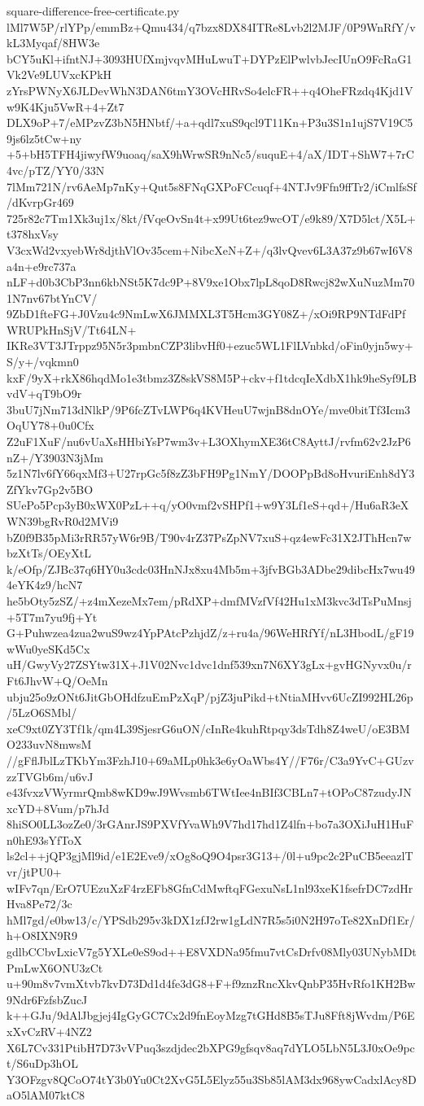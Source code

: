 \documentclass[11pt]{article}
\theoremstyle{definition}
\theoremstyle{remark}
\begin{document}
\begin{filecontents*}[overwrite]{square-difference-free-certificate.py}
lMl7W5P/rlYPp/emmBz+Qmu434/q7bzx8DX84ITRe8Lvb2l2MJF/0P9WnRfY/vkL3Myqaf/8HW3e
bCY5uKl+ifntNJ+3093HUfXmjvqvMHuLwuT+DYPzElPwlvbJecIUnO9FcRaG1Vk2Ve9LUVxcKPkH
zYrsPWNyX6JLDevWhN3DAN6tmY3OVcHRvSo4elcFR++q4OheFRzdq4Kjd1Vw9K4Kju5VwR+4+Zt7
DLX9oP+7/eMPzvZ3bN5HNbtf/+a+qdl7xuS9qcl9T11Kn+P3u3S1n1ujS7V19C59js6lz5tCw+ny
+5+bH5TFH4jiwyfW9uoaq/saX9hWrwSR9nNc5/suquE+4/aX/IDT+ShW7+7rC4vc/pTZ/YY0/33N
7lMm721N/rv6AeMp7nKy+Qut5s8FNqGXPoFCcuqf+4NTJv9Ffn9ffTr2/iCmlfsSf/dKvrpGr469
725r82c7Tm1Xk3uj1x/8kt/fVqeOvSn4t+x99Ut6tez9wcOT/e9k89/X7D5lct/X5L+t378hxVsy
V3cxWd2vxyebWr8djthVlOv35cem+NibcXeN+Z+/q3lvQvev6L3A37z9b67wI6V8a4n+e9rc737a
nLF+d0b3CbP3nn6kbNSt5K7dc9P+8V9xe1Obx7lpL8qoD8Rwcj82wXuNuzMm701N7nv67btYnCV/
9ZbD1fteFG+J0Vzu4c9NmLwX6JMMXL3T5Hcm3GY08Z+/xOi9RP9NTdFdPfWRUPkHnSjV/Tt64LN+
IKRe3VT3JTrppz95N5r3pmbnCZP3libvHf0+ezuc5WL1FlLVnbkd/oFin0yjn5wy+S/y+/vqkmn0
kxF/9yX+rkX86hqdMo1e3tbmz3Z8skVS8M5P+ckv+f1tdcqIeXdbX1hk9heSyf9LBvdV+qT9bO9r
3buU7jNm713dNlkP/9P6fcZTvLWP6q4KVHeuU7wjnB8dnOYe/mve0bitTf3Icm3OqUY78+0u0Cfx
Z2uF1XuF/nu6vUaXsHHbiYsP7wm3v+L3OXhymXE36tC8AyttJ/rvfm62v2JzP6nZ+/Y3903N3jMm
5z1N7lv6fY66qxMf3+U27rpGc5f8zZ3bFH9Pg1NmY/DOOPpBd8oHvuriEnh8dY3ZfYkv7Gp2v5BO
SUePo5Pcp3yB0xWX0PzL++q/yO0vmf2vSHPf1+w9Y3Lf1eS+qd+/Hu6aR3eXWN39bgRvR0d2MVi9
bZ0f9B35pMi3rRR57yW6r9B/T90v4rZ37PsZpNV7xuS+qz4ewFc31X2JThHcn7wbzXtTs/OEyXtL
k/eOfp/ZJBc37q6HY0u3cdc03HnNJx8xu4Mb5m+3jfvBGb3ADbe29dibcHx7wu494eYK4z9/hcN7
he5bOty5zSZ/+z4mXezeMx7em/pRdXP+dmfMVzfVf42Hu1xM3kvc3dTsPuMnsj+5T7m7yu9fj+Yt
G+Puhwzea4zua2wuS9wz4YpPAtcPzhjdZ/z+ru4a/96WeHRfYf/nL3HbodL/gF19wWu0yeSKd5Cx
uH/GwyVy27ZSYtw31X+J1V02Nvc1dvc1dnf539xn7N6XY3gLx+gvHGNyvx0u/rFt6JhvW+Q/OeMn
ubju25o9zONt6JitGbOHdfzuEmPzXqP/pjZ3juPikd+tNtiaMHvv6UcZI992HL26p/5LzO6SMbl/
xeC9xt0ZY3Tf1k/qm4L39SjesrG6uON/cInRe4kuhRtpqy3dsTdh8Z4weU/oE3BMO233uvN8mwsM
//gFflJblLzTKbYm3FzhJ10+69aMLp0hk3e6yOaWbs4Y//F76r/C3a9YvC+GUzvzzTVGb6m/u6vJ
e43fvxzVWyrmrQmb8wKD9wJ9Wvsmb6TWtIee4nBIf3CBLn7+tOPoC87zudyJNxcYD+8Vum/p7hJd
8hiSO0LL3ozZe0/3rGAnrJS9PXVfYvaWh9V7hd17hd1Z4lfn+bo7a3OXiJuH1HuFn0hE93sYfToX
ls2cl++jQP3gjMl9id/e1E2Eve9/xOg8oQ9O4psr3G13+/0l+u9pc2c2PuCB5eeazlTvr/jtPU0+
wIFv7qn/ErO7UEzuXzF4rzEFb8GfnCdMwftqFGexuNsL1nl93xeK1fsefrDC7zdHrHva8Pe72/3c
hMl7gd/e0bw13/c/YPSdb295v3kDX1zfJ2rw1gLdN7R5s5i0N2H97oTe82XnDf1Er/h+O8IXN9R9
gdlbCCbvLxicV7g5YXLe0eS9od++E8VXDNa95fmu7vtCsDrfv08Mly03UNybMDtPmLwX6ONU3zCt
u+90m8v7vmXtvb7kvD73Dd1d4fe3dG8+F+f9znzRncXkvQnbP35HvRfo1KH2Bw9Ndr6FzfsbZucJ
k++GJu/9dAlJbgjej4IgGyGC7Cx2d9fnEoyMzg7tGHd8B5sTJu8Fft8jWvdm/P6ExXvCzRV+4NZ2
X6L7Cv331PtibH7D73vVPuq3szdjdec2bXPG9gfsqv8aq7dYLO5LbN5L3J0xOe9pct/S6uDp3hOL
Y3OFzgv8QCoO74tY3b0Yu0Ct2XvG5L5Elyz55u3Sb85lAM3dx968ywCadxlAcy8DaO5lAM07ktC8

\end{filecontents*}
\end{document}
